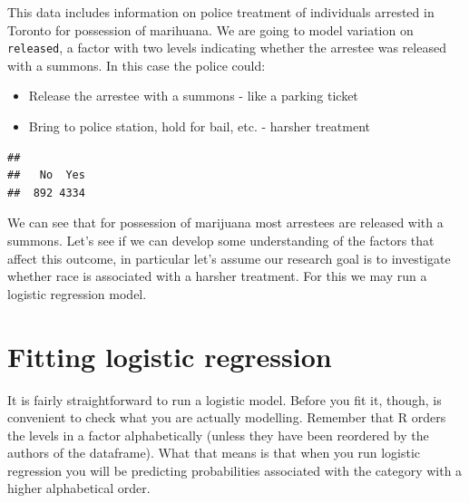 \documentclass[
]{book}
\newenvironment{Shaded}{\begin{snugshade}}{\end{snugshade}}
\newcommand{\CommentTok}[1]{\textcolor[rgb]{0.56,0.35,0.01}{\textit{#1}}}
\newcommand{\FunctionTok}[1]{\textcolor[rgb]{0.00,0.00,0.00}{#1}}
\newcommand{\NormalTok}[1]{#1}
\newcommand{\SpecialCharTok}[1]{\textcolor[rgb]{0.00,0.00,0.00}{#1}}
\begin{document}
This data includes information on police treatment of individuals arrested in Toronto for possession of marihuana. We are going to model variation on \texttt{released}, a factor with two levels indicating whether the arrestee was released with a summons. In this case the police could:

\begin{itemize}
\item
  Release the arrestee with a summons - like a parking ticket
\item
  Bring to police station, hold for bail, etc. - harsher treatment
\end{itemize}

\begin{Shaded}
\end{Shaded}

\begin{verbatim}
## 
##   No  Yes 
##  892 4334
\end{verbatim}

We can see that for possession of marijuana most arrestees are released with a summons. Let's see if we can develop some understanding of the factors that affect this outcome, in particular let's assume our research goal is to investigate whether race is associated with a harsher treatment. For this we may run a logistic regression model.

\hypertarget{fitting-logistic-regression}{%
\section{Fitting logistic regression}\label{fitting-logistic-regression}}

It is fairly straightforward to run a logistic model. Before you fit it, though, is convenient to check what you are actually modelling. Remember that R orders the levels in a factor alphabetically (unless they have been reordered by the authors of the dataframe). What that means is that when you run logistic regression you will be predicting probabilities associated with the category with a higher alphabetical order.

\begin{Shaded}
\end{Shaded}
\end{document}
